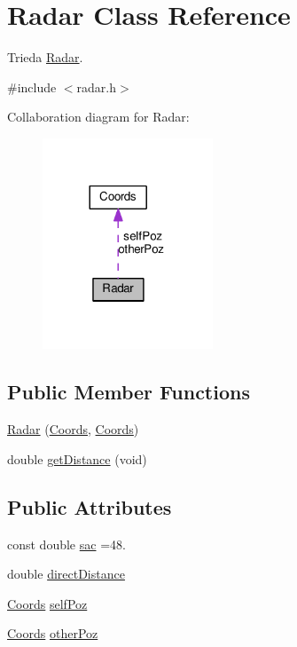 \hypertarget{classRadar}{\section{Radar Class Reference}
\label{classRadar}
}


Trieda \hyperlink{classRadar}{Radar}.  




{\ttfamily \#include $<$radar.\-h$>$}



Collaboration diagram for Radar\-:
\nopagebreak
\begin{figure}[H]
\begin{center}
\leavevmode
\includegraphics[width=144pt]{classRadar__coll__graph}
\end{center}
\end{figure}
\subsection*{Public Member Functions}
\begin{DoxyCompactItemize}
\item 
\hyperlink{classRadar_a7b410a3b89ddce8d0cd887cec9a68e4c}{Radar} (\hyperlink{classCoords}{Coords}, \hyperlink{classCoords}{Coords})
\item 
double \hyperlink{classRadar_acd5a884b01ca6a2f63fd2e09a2521709}{get\-Distance} (void)
\end{DoxyCompactItemize}
\subsection*{Public Attributes}
\begin{DoxyCompactItemize}
\item 
const double \hyperlink{classRadar_ab545a02c2a5d688cb520115fc0e4dcf4}{sac} =48.
\item 
double \hyperlink{classRadar_a462d860ac5b4af6246074aae7082c94c}{direct\-Distance}
\item 
\hyperlink{classCoords}{Coords} \hyperlink{classRadar_a2475d8141970088a5a6aa92eb0f6535d}{self\-Poz}
\item 
\hyperlink{classCoords}{Coords} \hyperlink{classRadar_aed5172c436c4a1803d6d9f978f3eee02}{other\-Poz}
\end{DoxyCompactItemize}


